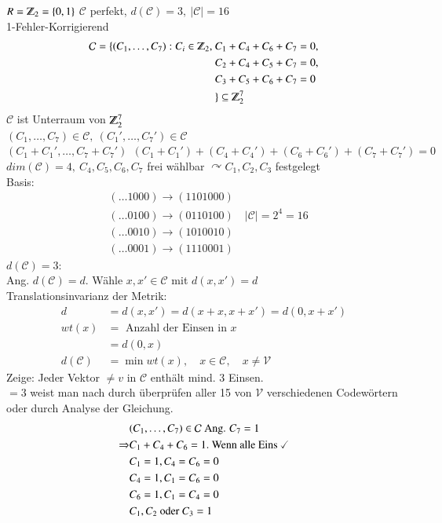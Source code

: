 $R=\Z_2=\lbrace 0,1 \rbrace$ $\mathcal{C}$ perfekt, $d(\mathcal{C})=3,\ \left| \mathcal{C} \right| = 16$ \\
1-Fehler-Korrigierend
\begin{align*}
\mathcal{C} = \lbrace (C_1,\ldots,C_7) : C_i \in \Z_2,\ &C_1 + C_4 + C_6 + C_7 = 0,\\
										&C_2 + C_4 + C_5 + C_7 = 0,\\
										&C_3 + C_5 + C_6 + C_7 = 0\\
										 &\rbrace \subseteq \Z_2^7
\end{align*}
$\mathcal{C}$ ist Unterraum von $\Z_2^7$ \\
$(C_1,\ldots,C_7) \in \mathcal{C},\ (C_1',\ldots,C_7') \in \mathcal{C}$ \\
$(C_1 + C_1',\ldots,C_7+C_7')\ \ (C_1+C_1') + (C_4+C_4') + (C_6+C_6') + (C_7+C_7') = 0$ \\
$dim(\mathcal{C})=4,\ C_4,C_5,C_6,C_7$ frei w\"ahlbar $\curvearrowright C_1,C_2,C_3$ festgelegt \\
Basis:
\begin{align*}
	&(\ldots 1000) \rightarrow (1101000) \\
	&(\ldots 0100) \rightarrow (0110100) \quad \left| \mathcal{C} \right| =2^4 =16\\
	&(\ldots 0010) \rightarrow (1010010) \\
	&(\ldots 0001) \rightarrow (1110001)
\end{align*}
$d(\mathcal{C})=3:$\\
Ang. $d(\mathcal{C})=d$. W\"ahle $x,x' \in \mathcal{C}$ mit $d(x,x')=d$\\
Translationsinvarianz der Metrik: \\
\begin{align*}
	d &=d(x,x')=d(x+x,x+x')=d(0,x+x') \\
	wt(x) &= \text{ Anzahl der Einsen in } x \\
	&= d(0,x)\\
	d(\mathcal{C}) &= \min wt(x),\quad x \in \mathcal{C},\quad x \neq \mathcal{V}
\end{align*}
Zeige: Jeder Vektor $\neq v$ in $\mathcal{C}$ enth\"alt mind. 3 Einsen.\\
$= 3$ weist man nach durch \"uberpr\"ufen aller 15 von $\mathcal{V}$ verschiedenen Codew\"ortern oder durch Analyse der Gleichung. 
\begin{align*}
	&(C_1,\ldots,C_7) \in \mathcal{C} \text{ Ang. } C_7=1 \\
	\Rightarrow &C_1+C_4+C_6=1. \text{ Wenn alle Eins } \checked \\
	&C_1=1,C_4=C_6=0\\
	&C_4=1,C_1=C_6=0\\
	&C_6=1,C_1=C_4=0\\
	&C_1, C_2\text{ oder } C_3 = 1
\end{align*}
